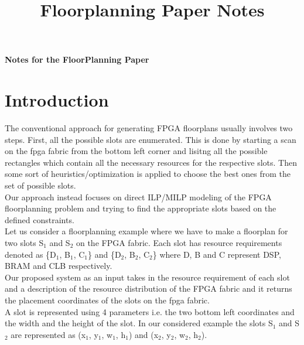 \documentclass[11pt]{article}
\theoremstyle{definition}
\begin{document}
\title{Floorplanning Paper Notes}

\thispagestyle{empty}

\begin{center}
{\LARGE \bf Notes for the FloorPlanning Paper}\\
\end{center}

\section{Introduction}
The conventional approach for generating FPGA floorplans usually involves two steps. First, all the possible slots are enumerated. This is done by starting a scan on the fpga fabric from the bottom left corner and lisitng all the possible rectangles which contain all the necessary resources for the respective slots. Then some sort of heuristics/optimization is applied to choose the best ones from the set of possible slots.\\
Our approach instead focuses on direct ILP/MILP modeling of the FPGA floorplanning problem and trying to find the appropriate slots based on the defined constraints.\\

Let us consider a floorplanning example where we have to make a floorplan for two slots S$_1$ and S$_2$ on the FPGA fabric. Each slot has resource requirements denoted as \{D$_1$, B$_1$, C$_1$\} and \{D$_2$, B$_2$, C$_2$\} where D, B and C represent DSP, BRAM and CLB respectively. \\ Our proposed system as an input takes in the resource requirement of each slot and a description of the resource distribution of the FPGA fabric and it returns the placement coordinates of the slots on the fpga fabric. \\
A slot is represented using 4 parameters i.e. the two bottom left coordinates and the width and the height of the slot. In our considered example the slots S$_1$ and S$_2$ are represented as (x$_1$, y$_1$, w$_1$, h$_1$) and (x$_2$, y$_2$, w$_2$, h$_2$). \\
\end{document}
